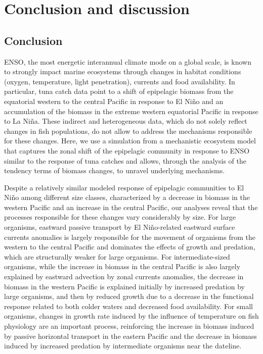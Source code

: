 
\section{Conclusion and discussion}
\label{sec:conclusion}


\subsection{Conclusion}

ENSO, the most energetic interannual climate mode on a  global scale, is known to strongly impact marine ecosystems through changes in habitat conditions (oxygen, temperature, light penetration), currents and food availability. In particular, tuna catch data point to a shift of epipelagic biomass from the equatorial western to the central Pacific in response to El Niño and an accumulation of the biomass in the extreme western equatorial Pacific in response to La Niña. These indirect and heterogeneous data, which do not solely reflect changes in fish populations, do not allow to address the mechanisms responsible for these changes. Here, we use a simulation from a mechanistic ecosystem model that captures the zonal shift of the epipelagic community in response to ENSO similar to the response of tuna catches and allows, through the analysis of the tendency terms of biomass changes, to unravel underlying mechanisms.

Despite a relatively similar modeled response of epipelagic communities to El Niño among different size classes, characterized by a decrease in biomass in the western Pacific and an increase in the central Pacific, our analyses reveal that the processes responsible for these changes vary considerably by size. For large organisms,  eastward passive transport by El Niño-related eastward surface currents anomalies is largely responsible for the movement of organisms from the western to the central Pacific and dominates the effects of growth and predation, which are structurally weaker for large organisms. For intermediate-sized organisms, while the increase in biomass in the central Pacific is also largely explained by eastward advection by zonal currents anomalies, the decrease in biomass in the western Pacific is explained initially by increased predation by large organisms, and then by reduced growth due to a decrease in the functional response related to both colder waters and decreased food availability. For small organisms, changes in growth rate  induced by the influence of temperature on fish physiology are an important process, reinforcing the increase in biomass induced by passive horizontal transport in the eastern Pacific and the decrease in biomass induced by increased predation by intermediate organisms near the dateline.

